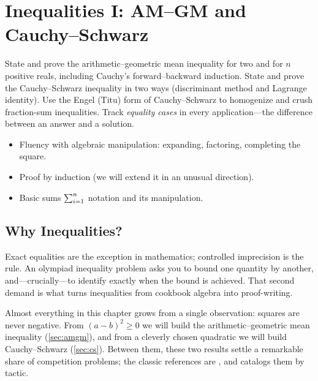 
\chapter{Inequalities I: \texorpdfstring{AM--GM}{AM-GM} and
         \texorpdfstring{Cauchy--Schwarz}{Cauchy-Schwarz}}
\label{ch:ineq1}

\begin{objectives}
\begin{itemize}
  \objective State and prove the arithmetic--geometric mean inequality
    for two and for $n$ positive reals, including Cauchy's
    forward--backward induction.
  \objective State and prove the Cauchy--Schwarz inequality in two
    ways (discriminant method and Lagrange identity).
  \objective Use the Engel (Titu) form of Cauchy--Schwarz to
    homogenize and crush fraction-sum inequalities.
  \objective Track \emph{equality cases} in every application---the
    difference between an answer and a solution.
\end{itemize}
\end{objectives}

\begin{prerequisites}
\begin{itemize}
  \item Fluency with algebraic manipulation: expanding, factoring,
    completing the square.
  \item Proof by induction (we will extend it in an unusual direction).
  \item Basic sums $\sum_{i=1}^{n}$ notation and its manipulation.
\end{itemize}
\end{prerequisites}

\section{Why Inequalities?}

Exact equalities are the exception in mathematics; controlled
imprecision is the rule. An olympiad inequality problem asks you to
bound one quantity by another, and---crucially---to identify exactly
when the bound is achieved. That second demand is what turns
inequalities from cookbook algebra into proof-writing.

Almost everything in this chapter grows from a single observation:
squares are never negative. From $(a-b)^2 \ge 0$ we will build the
arithmetic--geometric mean inequality (\cref{sec:amgm}), and from a
cleverly chosen quadratic we will build Cauchy--Schwarz
(\cref{sec:cs}). Between them, these two results settle a remarkable
share of competition problems; the classic references are
\cite{steele2004, hlp1952}, and \cite{engel1998} catalogs them by
tactic.

